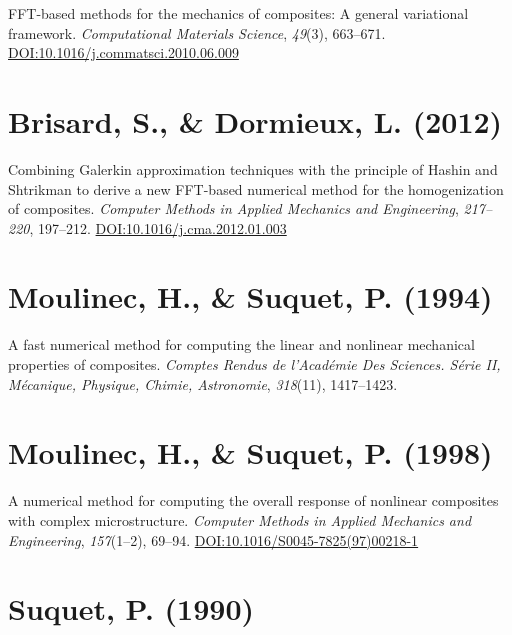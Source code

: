 \documentclass[oneside]{memoir}
\begin{document}
FFT-based methods for the mechanics of composites: A general variational framework. \emph{Computational Materials Science}, \emph{49}(3), 663–671. \href{https://doi.org/10.1016/j.commatsci.2010.06.009}{DOI:10.1016/j.commatsci.2010.06.009}



\hypertarget{17627112247925688930}{}


\section{Brisard, S., \& Dormieux, L. (2012)}



Combining Galerkin approximation techniques with the principle of Hashin and Shtrikman to derive a new FFT-based numerical method for the homogenization of composites. \emph{Computer Methods in Applied Mechanics and Engineering}, \emph{217–220}, 197–212. \href{https://doi.org/10.1016/j.cma.2012.01.003}{DOI:10.1016/j.cma.2012.01.003}



\hypertarget{8653883748112457965}{}


\section{Moulinec, H., \& Suquet, P. (1994)}



A fast numerical method for computing the linear and nonlinear mechanical properties of composites. \emph{Comptes Rendus de l’Académie Des Sciences. Série II, Mécanique, Physique, Chimie, Astronomie}, \emph{318}(11), 1417–1423.



\hypertarget{9534833447558490031}{}


\section{Moulinec, H., \& Suquet, P. (1998)}



A numerical method for computing the overall response of nonlinear composites with complex microstructure. \emph{Computer Methods in Applied Mechanics and Engineering}, \emph{157}(1–2), 69–94. \href{https://doi.org/10.1016/S0045-7825(97)00218-1}{DOI:10.1016/S0045-7825(97)00218-1}



\hypertarget{15745057744408808743}{}


\section{Suquet, P. (1990)}
\end{document}
